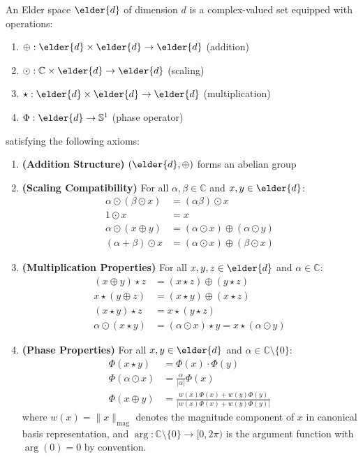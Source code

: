 \begin{definition}
An Elder space $\elder{d}$ of dimension $d$ is a complex-valued set equipped with operations:
\begin{enumerate}
    \item $\oplus: \elder{d} \times \elder{d} \rightarrow \elder{d}$ (addition)
    \item $\odot: \mathbb{C} \times \elder{d} \rightarrow \elder{d}$ (scaling)
    \item $\star: \elder{d} \times \elder{d} \rightarrow \elder{d}$ (multiplication)
    \item $\Phi: \elder{d} \rightarrow \mathbb{S}^1$ (phase operator)
\end{enumerate}
satisfying the following axioms:
\begin{enumerate}[label=\textbf{A\arabic*}]
    \item \textbf{(Addition Structure)} $(\elder{d}, \oplus)$ forms an abelian group
    \item \textbf{(Scaling Compatibility)} For all $\alpha, \beta \in \mathbb{C}$ and $x, y \in \elder{d}$:
    \begin{align}
        \alpha \odot (\beta \odot x) &= (\alpha\beta) \odot x\\
        1 \odot x &= x\\
        \alpha \odot (x \oplus y) &= (\alpha \odot x) \oplus (\alpha \odot y)\\
        (\alpha + \beta) \odot x &= (\alpha \odot x) \oplus (\beta \odot x)
    \end{align}
    
    \item \textbf{(Multiplication Properties)} For all $x, y, z \in \elder{d}$ and $\alpha \in \mathbb{C}$:
    \begin{align}
        (x \oplus y) \star z &= (x \star z) \oplus (y \star z)\\
        x \star (y \oplus z) &= (x \star y) \oplus (x \star z)\\
        (x \star y) \star z &= x \star (y \star z)\\
        \alpha \odot (x \star y) &= (\alpha \odot x) \star y = x \star (\alpha \odot y)
    \end{align}
    
    \item \textbf{(Phase Properties)} For all $x, y \in \elder{d}$ and $\alpha \in \mathbb{C} \setminus \{0\}$:
    \begin{align}
        \Phi(x \star y) &= \Phi(x) \cdot \Phi(y)\\
        \Phi(\alpha \odot x) &= \frac{\alpha}{|\alpha|} \Phi(x)\\
        \Phi(x \oplus y) &= \frac{w(x)\Phi(x) + w(y)\Phi(y)}{|w(x)\Phi(x) + w(y)\Phi(y)|}
    \end{align}
    where $w(x) = \|x\|_{\text{mag}}$ denotes the magnitude component of $x$ in canonical basis representation, and $\arg: \mathbb{C} \setminus \{0\} \rightarrow [0, 2\pi)$ is the argument function with $\arg(0) = 0$ by convention.
\end{enumerate}
\end{definition}

